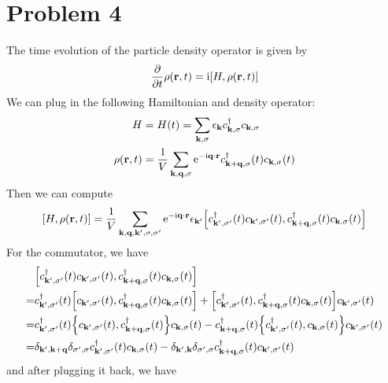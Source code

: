 \documentclass{article}
\newcommand{\ii}{\mathrm{i}}
\newcommand{\me}{\mathrm{e}}
\begin{document}
\section*{Problem 4}
The time evolution of the particle density operator is given by
\begin{equation}
    \pdv{t}\rho(\vb{r},t)=\ii\comm{H}{\rho(\vb{r},t)}
\end{equation}
We can plug in the following Hamiltonian and density operator:
\begin{subequations}
    \begin{align}
        H&=H(t)=\sum_{\vb{k},\sigma}\epsilon_{\vb{k}}c_{\vb{k},\sigma}^\dagger c_{\vb{k},\sigma}\\
        \rho(\vb{r},t)&=\frac{1}{V}\sum_{\vb{k},\vb{q},\sigma}\me^{-\ii\vb{q}\cdot \vb{r}}c_{\vb{k}+\vb{q},\sigma}^\dagger(t) c_{\vb{k},\sigma}(t)
    \end{align}
\end{subequations}
Then we can compute
\begin{equation}
    \comm{H}{\rho(\vb{r},t)}=\frac{1}{V}\sum_{\vb{k},\vb{q},\vb{k}',\sigma,\sigma'}\me^{-\ii\vb{q}\cdot \vb{r}}\epsilon_{\vb{k}'}\comm{c_{\vb{k}',\sigma'}^\dagger(t) c_{\vb{k}',\sigma'}(t)}{c_{\vb{k}+\vb{q},\sigma}^\dagger(t) c_{\vb{k},\sigma}(t)}
\end{equation}
For the commutator, we have
\begin{equation}
    \begin{split}
        &\comm{c_{\vb{k}',\sigma'}^\dagger(t) c_{\vb{k}',\sigma'}(t)}{c_{\vb{k}+\vb{q},\sigma}^\dagger(t) c_{\vb{k},\sigma}(t)}\\
        =&c_{\vb{k}',\sigma'}^\dagger(t)\comm{c_{\vb{k}',\sigma'}(t)}{c_{\vb{k}+\vb{q},\sigma}^\dagger(t) c_{\vb{k},\sigma}(t)}+\comm{c_{\vb{k}',\sigma'}^\dagger(t)}{c_{\vb{k}+\vb{q},\sigma}^\dagger(t) c_{\vb{k},\sigma}(t)}c_{\vb{k}',\sigma'}(t)\\
        =&c_{\vb{k}',\sigma'}^\dagger(t)\acomm{c_{\vb{k}',\sigma'}(t)}{c_{\vb{k}+\vb{q},\sigma}^\dagger(t)}c_{\vb{k},\sigma}(t)-c_{\vb{k}+\vb{q},\sigma}^\dagger(t)\acomm{c_{\vb{k}',\sigma'}^\dagger(t)}{c_{\vb{k},\sigma}(t)}c_{\vb{k}',\sigma'}(t)\\
        =&\delta_{\vb{k}',\vb{k}+\vb{q}}\delta_{\sigma',\sigma}c_{\vb{k}',\sigma'}^\dagger(t)c_{\vb{k},\sigma}(t)-\delta_{\vb{k}',\vb{k}}\delta_{\sigma',\sigma}c_{\vb{k}+\vb{q},\sigma}^\dagger(t)c_{\vb{k}',\sigma'}(t)
    \end{split}
\end{equation}
and after plugging it back, we have
\end{document}
